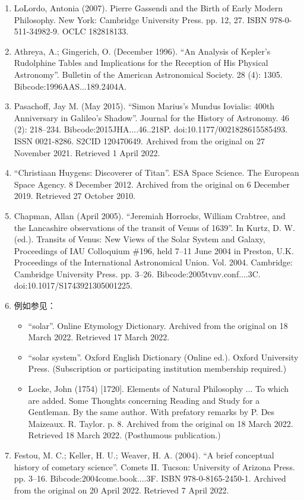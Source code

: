 \begin{enumerate}
\item LoLordo, Antonia (2007). Pierre Gassendi and the Birth of Early Modern Philosophy. New York: Cambridge University Press. pp. 12, 27. ISBN 978-0-511-34982-9. OCLC 182818133.
\item Athreya, A.; Gingerich, O. (December 1996). ``An Analysis of Kepler's Rudolphine Tables and Implications for the Reception of His Physical Astronomy''. Bulletin of the American Astronomical Society. 28 (4): 1305. Bibcode:1996AAS...189.2404A.
\item Pasachoff, Jay M. (May 2015). ``Simon Marius's Mundus Iovialis: 400th Anniversary in Galileo's Shadow''. Journal for the History of Astronomy. 46 (2): 218–234. Bibcode:2015JHA....46..218P. doi:10.1177/0021828615585493. ISSN 0021-8286. S2CID 120470649. Archived from the original on 27 November 2021. Retrieved 1 April 2022.
\item ``Christiaan Huygens: Discoverer of Titan''. ESA Space Science. The European Space Agency. 8 December 2012. Archived from the original on 6 December 2019. Retrieved 27 October 2010.
\item Chapman, Allan (April 2005). ``Jeremiah Horrocks, William Crabtree, and the Lancashire observations of the transit of Venus of 1639''. In Kurtz, D. W. (ed.). Transits of Venus: New Views of the Solar System and Galaxy, Proceedings of IAU Colloquium \#196, held 7–11 June 2004 in Preston, U.K. Proceedings of the International Astronomical Union. Vol. 2004. Cambridge: Cambridge University Press. pp. 3–26. Bibcode:2005tvnv.conf....3C. doi:10.1017/S1743921305001225.
\item 例如参见：
\begin{itemize}
\item ``solar''. Online Etymology Dictionary. Archived from the original on 18 March 2022. Retrieved 17 March 2022.
\item ``solar system''. Oxford English Dictionary (Online ed.). Oxford University Press. (Subscription or participating institution membership required.)
\item Locke, John (1754) [1720]. Elements of Natural Philosophy ... To which are added. Some Thoughts concerning Reading and Study for a Gentleman. By the same author. With prefatory remarks by P. Des Maizeaux. R. Taylor. p. 8. Archived from the original on 18 March 2022. Retrieved 18 March 2022. (Posthumous publication.)
\end{itemize}
\item Festou, M. C.; Keller, H. U.; Weaver, H. A. (2004). ``A brief conceptual history of cometary science''. Comets II. Tucson: University of Arizona Press. pp. 3–16. Bibcode:2004come.book....3F. ISBN 978-0-8165-2450-1. Archived from the original on 20 April 2022. Retrieved 7 April 2022.

\end{enumerate}
